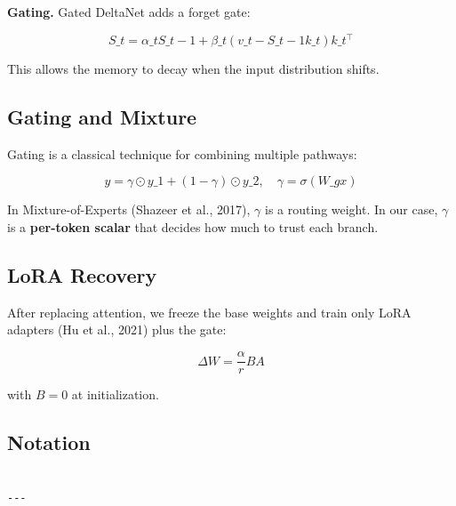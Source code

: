 \textbf{Gating.} Gated DeltaNet adds a forget gate:

\[
S\_t = \alpha\_t S\_{t-1} + \beta\_t (v\_t - S\_{t-1} k\_t) k\_t^\top
\tag{3.4}
\]

This allows the memory to decay when the input distribution shifts.

\subsection{Gating and Mixture}

Gating is a classical technique for combining multiple pathways:

\[
y = \gamma \odot y\_1 + (1 - \gamma) \odot y\_2, \quad
\gamma = \sigma(W\_g x)
\tag{3.5}
\]

In Mixture-of-Experts (Shazeer et al., 2017), $\gamma$ is a routing weight. 
In our case, $\gamma$ is a \textbf{per-token scalar} that decides how much to 
trust each branch.

\subsection{LoRA Recovery}

After replacing attention, we freeze the base weights and train only LoRA 
adapters (Hu et al., 2021) plus the gate:

\[
\Delta W = \frac{\alpha}{r} B A
\tag{3.6}
\]

with $B = 0$ at initialization.

\subsection{Notation}

\begin{lstlisting}

---
\end{lstlisting}
